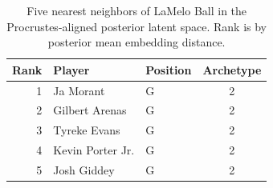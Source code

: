 \begin{table}[htbp]
  \centering\small
  \begin{tabular}{rllc}
    \toprule
    Rank & Player & Position & Archetype \\
    \midrule
    1 & Ja Morant & G & 2 \\
    2 & Gilbert Arenas & G & 2 \\
    3 & Tyreke Evans & G & 2 \\
    4 & Kevin Porter Jr. & G & 2 \\
    5 & Josh Giddey & G & 2 \\
    \bottomrule
  \end{tabular}
  \caption{Five nearest neighbors of LaMelo Ball in the Procrustes-aligned posterior latent space. Rank is by posterior mean embedding distance.}
  \label{tab:LaMelo_Ball_neighbors}
\end{table}

